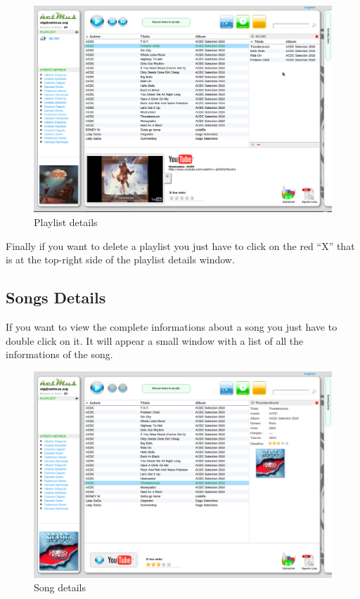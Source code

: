 \begin{figure}[htbp]
  \centering
  \includegraphics[width=15cm]{img/MU/playlist_song.png}
\caption{Playlist details}
\end{figure}

Finally if you want to delete a playlist you just have to click on the red ``X''
that is at the top-right side of the playlist details window.

\subsection*{Songs Details}

If you want to view the complete informations about a song you just have to
double click on it. It will appear a small window with a list of
all the informations of the song.\\
\begin{figure}[htbp]
  \centering
  \includegraphics[width=15cm]{img/MU/info_song.png}
\caption{Song details}
\end{figure}

